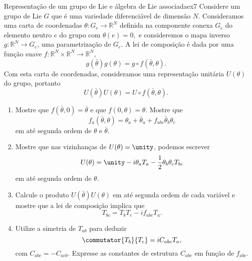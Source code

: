 \begin{exercício}{Representação de um grupo de Lie e álgebra de Lie associada}{ex7}
   Considere um grupo de Lie \(G\) que é uma variedade diferenciável de dimensão \(N\). Consideramos uma carta de coordenadas \(\theta : G_e \to \mathbb{R}^N\) definida na componente conexa \(G_e\) do elemento neutro \(e\) do grupo com \(\theta(e) = 0,\) e consideremos o mapa inverso \(g : \mathbb{R}^N \to G_e\), uma parametrização de \(G_e\). A lei de composição é dada por uma função suave \(f : \mathbb{R}^N \times \mathbb{R}^N \to \mathbb{R}^N\),
   \begin{equation*}
       g(\bar{\theta}) g(\theta) = g \circ f(\bar{\theta}, \theta).
   \end{equation*}
   Com esta carta de coordenadas, consideramos uma representação unitária \(U(\theta)\) do grupo, portanto
   \begin{equation*}
       U(\bar{\theta})U(\theta) = U \circ f(\bar{\theta}, \theta).
   \end{equation*}
   \begin{enumerate}[label=(\alph*)]
       \item Mostre que \(f(\bar{\theta}, 0) = \bar{\theta}\) e que \(f(0, \theta) = \theta\). Mostre que
          \begin{equation*}
             f_a(\bar{\theta}, \theta) = \theta_a + \bar{\theta}_a + f_{abc} \bar{\theta}_b \theta_c
          \end{equation*}
          em até segunda ordem de \(\theta\) e \(\bar{\theta}\).
       \item Mostre que nas vizinhanças de \(U(\theta) = \unity\), podemos escrever
          \begin{equation*}
             U(\theta) = \unity - i \theta_a T_a - \frac12 \theta_b \theta_c T_{bc}
          \end{equation*}
          em até segunda ordem de \(\theta\).
       \item Calcule o produto \(U(\bar{\theta})U(\theta)\) em até segunda ordem de cada variável e mostre que a lei de composição implica que
          \begin{equation*}
          T_{bc} = T_{b} T_{c} - i f_{abc} T_a.
          \end{equation*}
       \item Utilize a simetria de \(T_{ab}\) para deduzir
          \begin{equation*}
          \commutator{T_b}{T_c} = i C_{abc} T_a,
          \end{equation*}
          com \(C_{abc} = -C_{acb}.\) Expresse as constantes de estrutura \(C_{abc}\) em função de \(f_{abc}.\)
   \end{enumerate}
\end{exercício}
